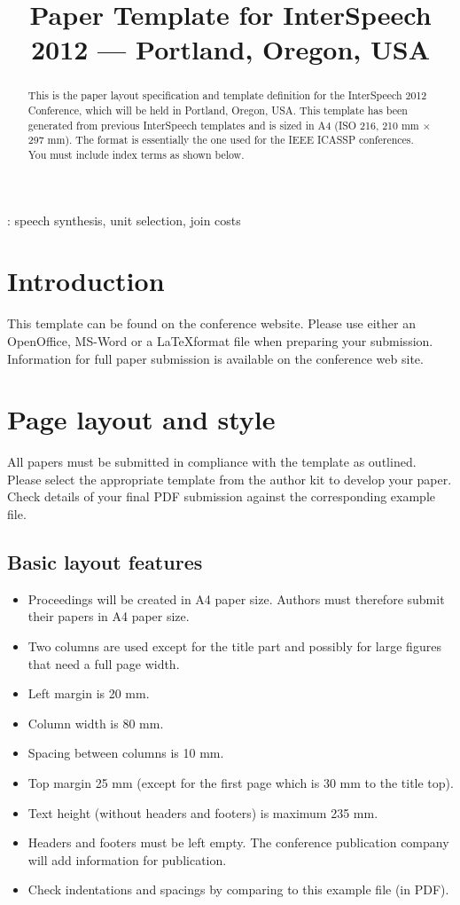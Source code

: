 \documentclass[a4paper]{article}
\title{Paper Template for InterSpeech 2012 --- Portland, Oregon, USA}
\begin{document}
\maketitle


\begin{abstract}
This is the paper layout specification and template definition for the InterSpeech 2012 Conference, which will be held in Portland, Oregon, USA.
This template has been generated from previous InterSpeech templates and is sized in A4 (ISO 216, 210 mm $\times$ 297 mm).
The format is essentially the one used for the IEEE ICASSP conferences.
You must include index terms as shown below.
\end{abstract}
: speech synthesis, unit selection, join costs


\section{Introduction}
This template can be found on the conference website.
Please use either an OpenOffice, MS-Word\textsuperscript{\textregistered} or a \LaTeX format file when preparing your submission.
Information for full paper submission is available on the conference web site.


\section{Page layout and style}
All papers must be submitted in compliance with the template as outlined.
Please select the appropriate template from the author kit to develop your paper.
Check details of your final PDF submission against the corresponding example file.


\subsection{Basic layout features}
\begin{itemize}
\item Proceedings will be created in A4 paper size.
Authors must therefore submit their papers in A4 paper size.
\item Two columns are used except for the title part and possibly for large 
figures that need a full page width.
\item Left margin is 20 mm.
\item Column width is 80 mm.
\item Spacing between columns is 10 mm.
\item Top margin 25 mm (except for the first page which is 30 mm to the title top).
\item Text height (without headers and footers) is maximum 235 mm.
\item Headers and footers must be left empty.
The conference publication company will add information for publication.
\item Check indentations and spacings by comparing to this 
example file (in PDF).
\end{itemize}
\end{document}
